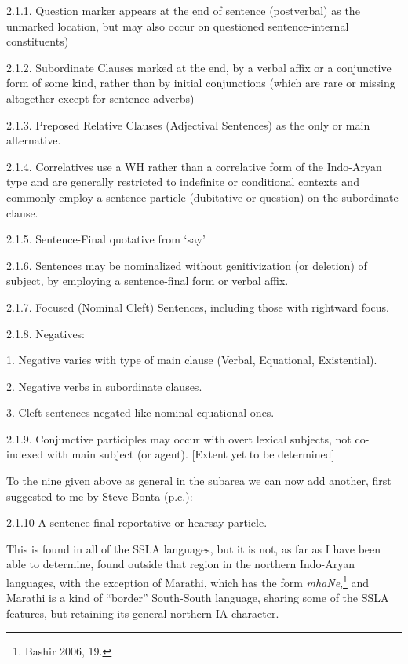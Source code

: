 \documentclass[letterpaper]{article}
\begin{document}
\begin{table}
2.1.1. Question marker appears at the end of sentence (postverbal) as the unmarked location, but may also occur on questioned sentence-internal constituents)

2.1.2. Subordinate Clauses marked at the end, by a verbal affix or a conjunctive form of some kind, rather than by initial conjunctions (which are rare or missing altogether except for sentence adverbs)

2.1.3. Preposed Relative Clauses (Adjectival Sentences) as the only or main alternative.

2.1.4. Correlatives use a WH rather than a correlative form of the Indo-Aryan type and are generally restricted to indefinite or conditional contexts and commonly employ a sentence particle (dubitative or question) on the subordinate clause.

2.1.5. Sentence-Final quotative from `say'

2.1.6. Sentences may be nominalized without genitivization (or deletion) of subject, by employing a sentence-final form or verbal affix.

2.1.7. Focused (Nominal Cleft) Sentences, including those with rightward focus.

2.1.8. Negatives:

 1. Negative varies with type of main clause (Verbal, Equational, Existential).

 2. Negative verbs in subordinate clauses.

 3. Cleft sentences negated like nominal equational ones.

2.1.9. Conjunctive participles may occur with overt lexical subjects, not co-indexed with main subject (or agent). [Extent yet to be determined]

\end{table}

To the nine given above as general in the subarea we can now add another, first suggested to me by Steve Bonta (p.c.):

2.1.10 A sentence-final reportative or hearsay particle.

 This is found in all of the SSLA languages, but it is not, as far as I have been able to determine, found outside that region  in the northern Indo-Aryan languages, with the exception of Marathi, which has the form \textit{mhaNe},\footnote{Bashir
   2006, 19.
} 
and  Marathi is a kind of ``border'' South-South language, sharing some of the SSLA features, but retaining its general northern IA character. 
\end{document}
